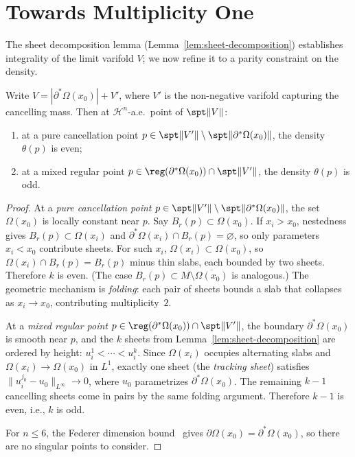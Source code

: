 
\section{Towards Multiplicity One}\label{sec:multiplicity-one}

The sheet decomposition lemma (Lemma~\ref{lem:sheet-decomposition}) establishes integrality of the limit varifold $V$; we now refine it to a parity constraint on the density.

\begin{proposition}\label{prop:density-parity}
Write $V = |\partial^*\Omega(x_0)| + V'$, where $V'$ is the non-negative varifold capturing the cancelling mass. Then at $\mathcal{H}^n$-a.e.\ point of $\spt\|V\|$:
\begin{enumerate}[label=\textup{(\roman*)}]
    \item at a pure cancellation point $p \in \spt\|V'\| \setminus \spt\|\partial^*\Omega(x_0)\|$, the density $\theta(p)$ is even;
    \item at a mixed regular point $p \in \reg(\partial^*\Omega(x_0)) \cap \spt\|V'\|$, the density $\theta(p)$ is odd.
\end{enumerate}
\end{proposition}

\begin{proof}
At a \emph{pure cancellation point} $p \in \spt\|V'\| \setminus \spt\|\partial^*\Omega(x_0)\|$, the set $\Omega(x_0)$ is locally constant near $p$. Say $B_r(p) \subset \Omega(x_0)$. If $x_i > x_0$, nestedness gives $B_r(p) \subset \Omega(x_i)$ and $\partial^*\Omega(x_i) \cap B_r(p) = \varnothing$, so only parameters $x_i < x_0$ contribute sheets. For such $x_i$, $\Omega(x_i) \subset \Omega(x_0)$, so $\Omega(x_i) \cap B_r(p) = B_r(p)$ minus thin slabs, each bounded by two sheets. Therefore $k$ is even. (The case $B_r(p) \subset M \setminus \overline{\Omega(x_0)}$ is analogous.) The geometric mechanism is \emph{folding}: each pair of sheets bounds a slab that collapses as $x_i \to x_0$, contributing multiplicity~$2$.

At a \emph{mixed regular point} $p \in \reg(\partial^*\Omega(x_0)) \cap \spt\|V'\|$, the boundary $\partial^*\Omega(x_0)$ is smooth near $p$, and the $k$ sheets from Lemma~\ref{lem:sheet-decomposition} are ordered by height: $u_i^1 < \cdots < u_i^k$. Since $\Omega(x_i)$ occupies alternating slabs and $\Omega(x_i) \to \Omega(x_0)$ in $L^1$, exactly one sheet (the \emph{tracking sheet}) satisfies $\|u_i^{j_0} - u_0\|_{L^\infty} \to 0$, where $u_0$ parametrizes $\partial^*\Omega(x_0)$. The remaining $k - 1$ cancelling sheets come in pairs by the same folding argument. Therefore $k - 1$ is even, i.e., $k$ is odd.

For $n \leq 6$, the Federer dimension bound~\cite[Section~37]{Sim84} gives $\partial\Omega(x_0) = \partial^*\Omega(x_0)$, so there are no singular points to consider.
\end{proof}

